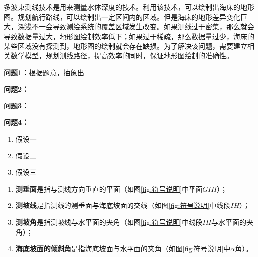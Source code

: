 \setcounter{page}{1}




多波束测线技术是用来测量水体深度的技术。利用该技术，可以绘制出海床的地形图。规划航行路线，可以绘制出一定区间内的区域。但是海床的地形差异变化巨大，深浅不一会导致测绘系统的覆盖区域发生改变。如果测线过于密集，那么就会导致数据量过大，地形图绘制效率低下；如果过于稀疏，那么数据量过少，海床的某些区域没有探测到，地形图的绘制就会存在缺损。为了解决该问题，需要建立相关数学模型，规划测线路径，提高效率的同时，保证地形图绘制的准确性。


\textbf{问题1：}根据题意，抽象出

\textbf{问题2：}

\textbf{问题3：}

\textbf{问题4：}







\begin{enumerate}
    \item 假设一
    \item 假设二
    \item 假设三
\end{enumerate}




\begin{enumerate}
    \item \textbf{测垂面}是指与测线方向垂直的平面（如图\ref{fig:符号说明}中平面$GIH$）；
    \item \textbf{测坡线}是指测线的测垂面与海底坡面的交线（如图\ref{fig:符号说明}中线段$IH$）；
    \item \textbf{测坡角}是指测坡线与水平面的夹角（如图\ref{fig:符号说明}中线段$IH$与水平面的夹角）；
    \item \textbf{海底坡面的倾斜角}是指海底坡面与水平面的夹角（如图\ref{fig:符号说明}中$\alpha$角）。\newline
\end{enumerate}

